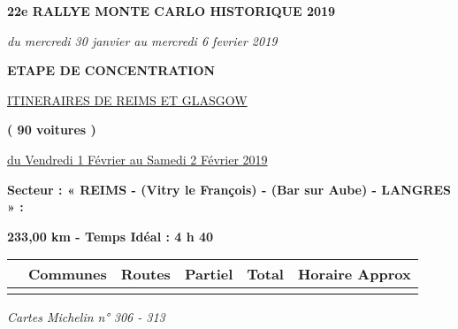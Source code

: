 \documentclass{article}%
\begin{document}
%
\normalsize%
\begin{center} \textbf{\LARGE{22e RALLYE MONTE CARLO HISTORIQUE 2019}} \end{center}%
\begin{flushleft} \textit{du mercredi 30 janvier au mercredi 6 fevrier 2019} \end{flushleft}%
\begin{center} \textbf{ETAPE DE CONCENTRATION} \end{center}%
\begin{center} \underline{ITINERAIRES DE REIMS ET GLASGOW} \end{center}%
\begin{center} \textbf{( 90 voitures )} \end{center}%
\begin{flushright} \underline{du  Vendredi 1 Février au Samedi 2 Février 2019} \end{flushright}%
\begin{flushleft} \textbf{Secteur : « REIMS - (Vitry le François) - (Bar sur Aube) - LANGRES » :
} \end{flushleft}%
\begin{flushright} \textbf{233,00 km - Temps Idéal : 4 h 40
} \end{flushright}%
\begin{longtable}{p{2.25cm}|p{7.0cm}|p{1.5cm}|p{1.5cm}|p{1.5cm}|p{3.5cm}}%
\hline%
&Communes&Routes&Partiel&Total&Horaire Approx\\%
\hline%
\endhead%
\endfoot%
\endlastfoot%
\hline%
\end{longtable}%
\begin{flushleft} \textit{Cartes Michelin n° 306 - 313 
} \end{flushleft}%
\end{document}
